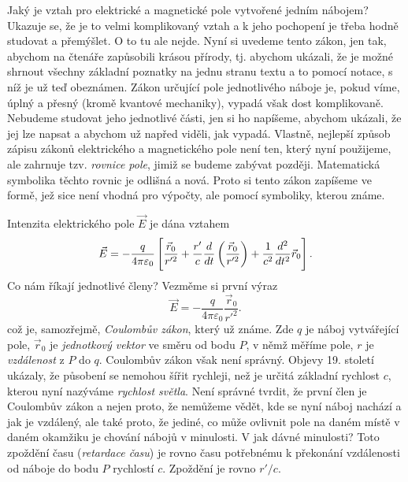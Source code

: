     Jaký je vztah pro elektrické a magnetické pole vytvořené jedním nábojem? Ukazuje se, že je to 
    velmi komplikovaný vztah a k jeho pochopení je třeba hodně studovat a přemýšlet. O to tu ale 
    nejde. Nyní si uvedeme tento zákon, jen tak, abychom na čtenáře zapůsobili krásou přírody, tj. 
    abychom ukázali, že je možné shrnout všechny základní poznatky na jednu stranu textu a to 
    pomocí notace, s níž je už teď obeznámen. Zákon určující pole jednotlivého náboje je, pokud 
    víme, úplný a přesný (kromě kvantové mechaniky), vypadá však dost komplikovaně. Nebudeme 
    studovat jeho jednotlivé části, jen si ho napíšeme, abychom ukázali, že jej lze napsat a 
    abychom už napřed viděli, jak vypadá. Vlastně, nejlepší způsob zápisu zákonů elektrického a 
    magnetického pole není ten, který nyní použijeme, ale zahrnuje tzv. \emph{rovnice pole}, jimiž 
    se budeme zabývat později. Matematická symbolika těchto rovnic je odlišná a nová. Proto si 
    tento zákon zapíšeme ve formě, jež sice není vhodná pro výpočty, ale pomocí symboliky, kterou 
    známe. 
    
    Intenzita elektrického pole \(\vec{E}\) je dána vztahem
    \begin{equation}\label{fyz:eq298}
      \vec{E} = -\frac{q}{4\pi\varepsilon_0}\left[
                 \frac{\vec{r}_0}{r'^2} + 
                 \frac{r'}{c}\dfrac{d  }{d t}\left(\frac{\vec{r}_0}{r'^2}\right) +
                 \frac{1}{c^2}\dfrac{d^2  }{d t^2}\vec{r}_0
                 \right].
    \end{equation}
    Co nám říkají jednotlivé členy? Vezměme si první výraz
    \begin{equation*}
      \vec{E} = -\frac{q}{4\pi\varepsilon_0}\frac{\vec{r}_0}{r'^2}. 
    \end{equation*}
    což je, samozřejmě, \emph{Coulombův zákon}, který už známe. Zde \(q\) je náboj vytvářející 
    pole, \(\vec{r}_0\) je \emph{jednotkový vektor} ve směru od bodu \(P\), v němž měříme pole, 
    \(r\) je \emph{vzdálenost} z \(P\) do \(q\). Coulombův zákon však není správný. Objevy 19. 
    století ukázaly, že působení se nemohou šířit rychleji, než je určitá základní rychlost \(c\), 
    kterou nyní nazýváme \emph{rychlost světla}. Není správné tvrdit, že první člen je Coulombův 
    zákon a nejen proto, že nemůžeme vědět, kde se nyní náboj nachází a jak je vzdálený, ale také 
    proto, že jediné, co může ovlivnit pole na daném místě v daném okamžiku je chování nábojů v 
    minulosti. V jak dávné minulosti? Toto zpoždění času (\emph{retardace času}) je rovno času 
    potřebnému k překonání vzdálenosti od náboje do bodu \(P\) rychlostí \(c\). Zpoždění je rovno 
    \(r'/c\). 
    
